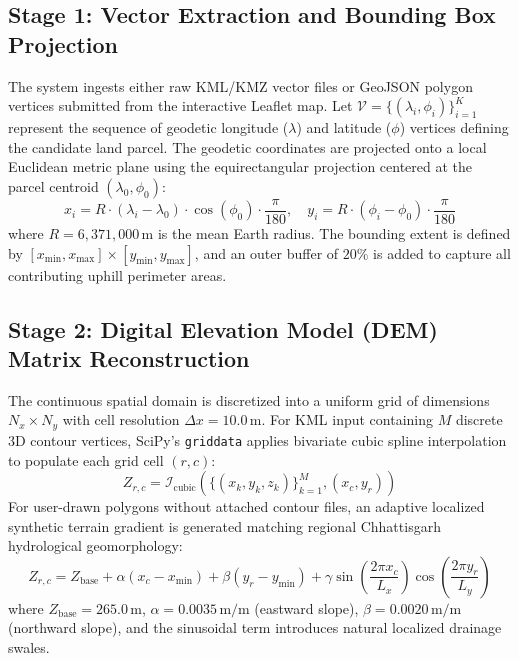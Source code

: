 \documentclass[11pt,a4paper]{article}
\begin{document}
\subsection{Stage 1: Vector Extraction and Bounding Box Projection}
The system ingests either raw KML/KMZ vector files or GeoJSON polygon vertices submitted from the interactive Leaflet map. Let $\mathcal{V} = \{(\lambda_i, \phi_i)\}_{i=1}^K$ represent the sequence of geodetic longitude ($\lambda$) and latitude ($\phi$) vertices defining the candidate land parcel. The geodetic coordinates are projected onto a local Euclidean metric plane using the equirectangular projection centered at the parcel centroid $(\lambda_0, \phi_0)$:
\begin{equation}
x_i = R \cdot (\lambda_i - \lambda_0) \cdot \cos(\phi_0) \cdot \frac{\pi}{180}, \quad
y_i = R \cdot (\phi_i - \phi_0) \cdot \frac{\pi}{180}
\label{eq:projection}
\end{equation}
where $R = 6,371,000\,\text{m}$ is the mean Earth radius. The bounding extent is defined by $[x_{\min}, x_{\max}] \times [y_{\min}, y_{\max}]$, and an outer buffer of $20\%$ is added to capture all contributing uphill perimeter areas.

\subsection{Stage 2: Digital Elevation Model (DEM) Matrix Reconstruction}
The continuous spatial domain is discretized into a uniform grid of dimensions $N_x \times N_y$ with cell resolution $\Delta x = 10.0\,\text{m}$. For KML input containing $M$ discrete 3D contour vertices, SciPy's \texttt{griddata} applies bivariate cubic spline interpolation to populate each grid cell $(r, c)$:
\begin{equation}
Z_{r, c} = \mathcal{I}_{\text{cubic}}\left(\{(x_k, y_k, z_k)\}_{k=1}^M, (x_c, y_r)\right)
\label{eq:dem_grid}
\end{equation}
For user-drawn polygons without attached contour files, an adaptive localized synthetic terrain gradient is generated matching regional Chhattisgarh hydrological geomorphology:
\begin{equation}
Z_{r,c} = Z_{\text{base}} + \alpha (x_c - x_{\min}) + \beta (y_r - y_{\min}) + \gamma \sin\left(\frac{2\pi x_c}{L_x}\right)\cos\left(\frac{2\pi y_r}{L_y}\right)
\label{eq:synthetic_dem}
\end{equation}
where $Z_{\text{base}} = 265.0\,\text{m}$, $\alpha = 0.0035\,\text{m/m}$ (eastward slope), $\beta = 0.0020\,\text{m/m}$ (northward slope), and the sinusoidal term introduces natural localized drainage swales.
\end{document}
